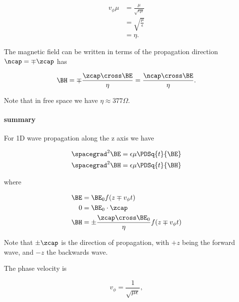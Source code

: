\begin{equation}\label{eqn:uwavesLecture2:540}
\begin{aligned}
v_\phi \mu &= \frac{\mu}{\sqrt{\epsilon\mu}} \\ &= \sqrt{\frac{\mu}{\epsilon}} \\ &= \eta.
\end{aligned}
\end{equation}

The magnetic field can be written in terms of the propagation direction \( \ncap = \mp \zcap \) has

\begin{equation}\label{eqn:uwavesLecture2:560}
\BH
= \mp \frac{\zcap \cross \BE}{\eta}
= \frac{\ncap \cross \BE}{\eta}.
\end{equation}

Note that in free space we have \( \eta \approx 377 \Omega \).

\paragraph{summary}

For 1D wave propagation along the z axis we have

\begin{equation}\label{eqn:uwavesLecture2:580}
\begin{aligned}
\spacegrad^2 \BE &= \epsilon \mu \PDSq{t}{\BE} \\
\spacegrad^2 \BH &= \epsilon \mu \PDSq{t}{\BH} \\
\end{aligned}
\end{equation}

where

\begin{equation}\label{eqn:uwavesLecture2:600}
\begin{aligned}
\BE &= \BE_0 f( z \mp v_\phi t ) \\
0 &= \BE_0 \cdot \zcap \\
\BH &= \pm \frac{\zcap \cross \BE_0}{\eta} f( z \mp v_\phi t )
\end{aligned}
\end{equation}

Note that \( \pm \zcap \) is the direction of propagation, with \( +z \) being the forward wave, and \( -z \) the backwards wave.

The phase velocity is

\begin{equation}\label{eqn:uwavesLecture2:620}
v_\phi = \frac{1}{\sqrt{\mu\epsilon}},
\end{equation}


